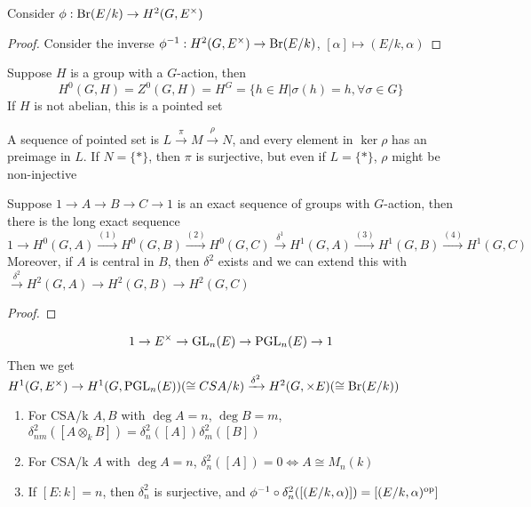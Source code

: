 \documentclass[a4paper,10pt]{article}
\begin{document}
\begin{theorem}
Consider $\phi:\operatorname{Br}(E/k)\to H^2(G,E^\times)$
\end{theorem}

\begin{proof}
Consider the inverse $\phi^{-1}:H^2(G,E^\times)\to \operatorname{Br}(E/k)$, $[\alpha]\mapsto(E/k,\alpha)$
\end{proof}

\begin{definition}
Suppose $H$ is a group with a $G$-action, then
\[
H^0(G,H)=Z^0(G,H)=H^G=\{h\in H|\sigma(h)=h,\forall\sigma\in G\}
\]
If $H$ is not abelian, this is a pointed set
\end{definition}

\begin{remark}
A sequence of pointed set is $L\xrightarrow{\pi} M\xrightarrow{\rho}N$, and every element in $\ker\rho$ has an preimage in $L$. If $N=\{*\}$, then $\pi$ is surjective, but even if $L=\{*\}$, $\rho$ might be non-injective
\end{remark}

\begin{proposition}
Suppose $1\to A\to B\to C\to1$ is an exact sequence of groups with $G$-action, then there is the long exact sequence
\[
1\to H^0(G,A)\xrightarrow{(1)} H^0(G,B)\xrightarrow{(2)} H^0(G,C)\xrightarrow{\delta^1}H^1(G,A)\xrightarrow{(3)} H^1(G,B)\xrightarrow{(4)} H^1(G,C)
\]
Moreover, if $A$ is central in $B$, then $\delta^2$ exists and we can extend this with $\xrightarrow{\delta^2}H^2(G,A)\to H^2(G,B)\to H^2(G,C)$
\end{proposition}

\begin{proof}

\end{proof}

\begin{example}
\[
1\to E^\times\to \operatorname{GL}_n(E)\to\operatorname{PGL}_n(E)\to1
\]
Then we get $H^1(G,E^\times)\to H^1(G,\operatorname{PGL}_n(E))(\cong CSA/k)\xrightarrow{\delta^2}H^2(G,\times E)(\cong\operatorname{Br}(E/k))$
\end{example}

\begin{proposition}
\begin{enumerate}
\item For CSA/k $A,B$ with $\deg A=n$, $\deg B=m$, $\delta^2_{nm}([A\otimes_kB])=\delta_n^2([A])\delta_m^2([B])$
\item For CSA/k $A$ with $\deg A=n$, $\delta_n^2([A])=0\iff A\cong M_n(k)$
\item If $[E:k]=n$, then $\delta_n^2$ is surjective, and $\phi^{-1}\circ\delta_n^2([(E/k,\alpha)])=[(E/k,\alpha)^{\operatorname{op}}]$
\end{enumerate}
\end{proposition}
\end{document}
